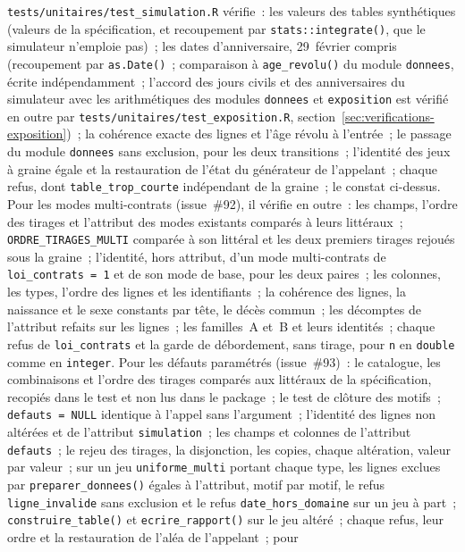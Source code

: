 \documentclass[a4paper,11pt]{article}
\newcommand{\code}[1]{\texttt{\small #1}}
\begin{document}
\code{tests/unitaires/test\_simulation.R} vérifie~: les valeurs des tables
synthétiques (valeurs de la spécification, et recoupement par
\code{stats::integrate()}, que le simulateur n'emploie pas)~; les dates
d'anniversaire, 29~février compris (recoupement par \code{as.Date()}~;
comparaison à \code{age\_revolu()} du module \code{donnees}, écrite
indépendamment~; l'accord des jours civils et des anniversaires du
simulateur avec les arithmétiques des modules \code{donnees} et
\code{exposition} est vérifié en outre par
\code{tests/unitaires/test\_exposition.R},
section~\ref{sec:verifications-exposition})~; la cohérence exacte des lignes et l'âge révolu à
l'entrée~; le passage du module \code{donnees} sans exclusion, pour les deux
transitions~; l'identité des jeux à graine égale et la restauration de l'état
du générateur de l'appelant~; chaque refus, dont \code{table\_trop\_courte}
indépendant de la graine~; le constat ci-dessus. Pour les modes
multi-contrats (issue~\#92), il vérifie en outre~: les champs, l'ordre des
tirages et l'attribut des modes existants comparés à leurs littéraux~;
\code{ORDRE\_TIRAGES\_MULTI} comparée à son littéral et les deux premiers
tirages rejoués sous la graine~; l'identité, hors attribut, d'un mode
multi-contrats de \code{loi\_contrats = 1} et de son mode de base, pour les
deux paires~; les colonnes, les types, l'ordre des lignes et les
identifiants~; la cohérence des lignes, la naissance et le sexe constants
par tête, le décès commun~; les décomptes de l'attribut refaits sur les
lignes~; les familles~A et~B et leurs identités~; chaque refus de
\code{loi\_contrats} et la garde de débordement, sans tirage, pour \code{n}
en \code{double} comme en \code{integer}. Pour les défauts paramétrés
(issue~\#93)~: le catalogue, les combinaisons et l'ordre des tirages
comparés aux littéraux de la spécification, recopiés dans le test et non lus
dans le package~; le test de clôture des motifs~; \code{defauts = NULL}
identique à l'appel sans l'argument~; l'identité des lignes non altérées et
de l'attribut \code{simulation}~; les champs et colonnes de l'attribut
\code{defauts}~; le rejeu des tirages, la disjonction, les copies, chaque
altération, valeur par valeur~; sur un jeu \code{uniforme\_multi} portant
chaque type, les lignes exclues par \code{preparer\_donnees()} égales à
l'attribut, motif par motif, le refus \code{ligne\_invalide} sans
exclusion et le refus \code{date\_hors\_domaine} sur un jeu à part~;
\code{construire\_table()} et \code{ecrire\_rapport()} sur le jeu altéré~;
chaque refus, leur ordre et la restauration de l'aléa de l'appelant~; pour
\end{document}
